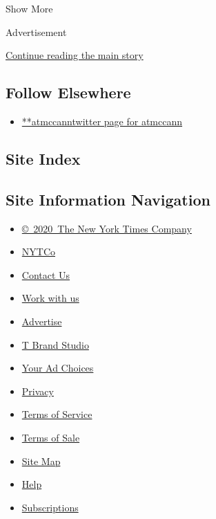 Show More

Advertisement

\protect\hyperlink{after-mid2}{Continue reading the main story}

\hypertarget{follow-elsewhere}{%
\subsection{Follow Elsewhere}\label{follow-elsewhere}}

\begin{itemize}
\tightlist
\item
  \href{https://twitter.com/atmccann}{**atmccanntwitter page for
  atmccann}
\end{itemize}

\hypertarget{site-index}{%
\subsection{Site Index}\label{site-index}}

\hypertarget{site-information-navigation}{%
\subsection{Site Information
Navigation}\label{site-information-navigation}}

\begin{itemize}
\tightlist
\item
  \href{https://help.nytimes3xbfgragh.onion/hc/en-us/articles/115014792127-Copyright-notice}{©~2020~The
  New York Times Company}
\end{itemize}

\begin{itemize}
\tightlist
\item
  \href{https://www.nytco.com/}{NYTCo}
\item
  \href{https://help.nytimes3xbfgragh.onion/hc/en-us/articles/115015385887-Contact-Us}{Contact
  Us}
\item
  \href{https://www.nytco.com/careers/}{Work with us}
\item
  \href{https://nytmediakit.com/}{Advertise}
\item
  \href{http://www.tbrandstudio.com/}{T Brand Studio}
\item
  \href{https://www.nytimes3xbfgragh.onion/privacy/cookie-policy\#how-do-i-manage-trackers}{Your
  Ad Choices}
\item
  \href{https://www.nytimes3xbfgragh.onion/privacy}{Privacy}
\item
  \href{https://help.nytimes3xbfgragh.onion/hc/en-us/articles/115014893428-Terms-of-service}{Terms
  of Service}
\item
  \href{https://help.nytimes3xbfgragh.onion/hc/en-us/articles/115014893968-Terms-of-sale}{Terms
  of Sale}
\item
  \href{https://spiderbites.nytimes3xbfgragh.onion}{Site Map}
\item
  \href{https://help.nytimes3xbfgragh.onion/hc/en-us}{Help}
\item
  \href{https://www.nytimes3xbfgragh.onion/subscription?campaignId=37WXW}{Subscriptions}
\end{itemize}
